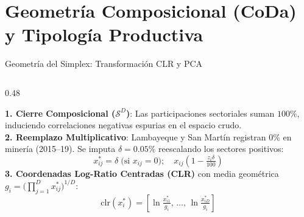 \section{Geometría Composicional (CoDa) y Tipología Productiva}

\begin{frame}{Geometría del Simplex: Transformación CLR y PCA}
\vspace{-0.18cm}
\begin{columns}[T,onlytextwidth]
\begin{column}{0.48\textwidth}
\begin{ccdebox}[left=2mm,right=2mm,top=1mm,bottom=1mm]
\scriptsize\RaggedRight
\textbf{1. Cierre Composicional ($\mathcal{S}^D$)}: Las participaciones sectoriales suman $100\%$, induciendo correlaciones negativas espurias en el espacio crudo.\\[0.06cm]
\textbf{2. Reemplazo Multiplicativo}: Lambayeque y San Martín registran $0\%$ en minería (2015--19). Se imputa $\delta = 0.05\%$ reescalando los sectores positivos:
\[
x_{ij}^* = \delta \;\text{(si } x_{ij}=0\text{)}; \quad x_{ij}\!\left(1 - \tfrac{z_i \delta}{100}\right)
\]
\textbf{3. Coordenadas Log-Ratio Centradas (CLR)} con media geométrica $g_i = \big(\prod_{j=1}^D x_{ij}^*\big)^{1/D}$:
\[
\mathrm{clr}(x_i^*) = \left[ \ln\tfrac{x_{i1}^*}{g_i},\, \dots,\, \ln\tfrac{x_{iD}^*}{g_i} \right]
\]
\end{ccdebox}
\end{column}


\end{columns}
\end{frame}
